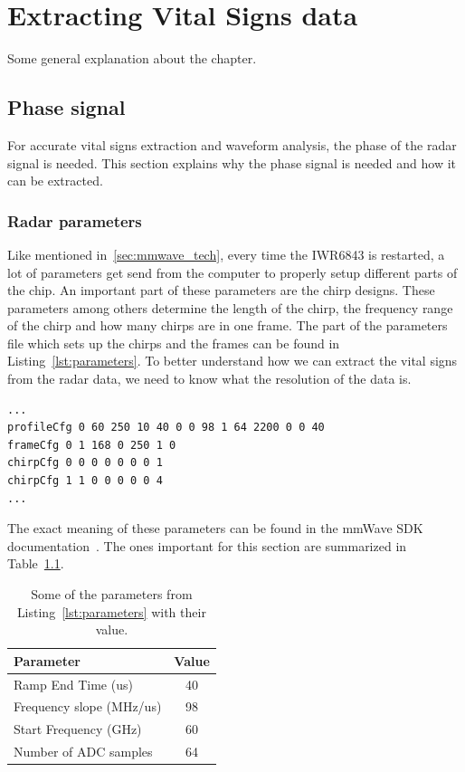 \chapter{Extracting Vital Signs data}
\label{chp:measuring_vital_signs}
Some general explanation about the chapter.

\section{Phase signal}
For accurate vital signs extraction and waveform analysis, the phase of the radar signal is needed. This section explains why the phase signal is needed and how it can be extracted.

\subsection{Radar parameters}
\label{sec:radar_parameters}
Like mentioned in~\ref{sec:mmwave_tech}, every time the IWR6843 is restarted, a lot of parameters get send from the computer to properly setup different parts of the chip. An important part of these parameters are the chirp designs. These parameters among others determine the length of the chirp, the frequency range of the chirp and how many chirps are in one frame. The part of the parameters file which sets up the chirps and the frames can be found in Listing~\ref{lst:parameters}. To better understand how we can extract the vital signs from the radar data, we need to know what the resolution of the data is.

\begin{lstlisting}[label=lst:parameters, caption=Portion of the parameters file which gets send to the IWR6843 to set it up.]
...
profileCfg 0 60 250 10 40 0 0 98 1 64 2200 0 0 40
frameCfg 0 1 168 0 250 1 0
chirpCfg 0 0 0 0 0 0 0 1
chirpCfg 1 1 0 0 0 0 0 4
...
\end{lstlisting}

The exact meaning of these parameters can be found in the mmWave SDK documentation~\cite{mmwavesdk_website}. The ones important for this section are summarized in Table~\ref{tab:parameters}.

\begin{table}[t]
\centering
\begin{tabular}{|l|c|}
\hline
Parameter & Value \\ \hline
Ramp End Time (us) & 40 \\
Frequency slope (MHz/us) & 98 \\
Start Frequency (GHz) & 60 \\
Number of ADC samples & 64 \\ \hline
\end{tabular}
\caption{Some of the parameters from Listing~\ref{lst:parameters} with their value.}
\label{tab:parameters}
\end{table}


